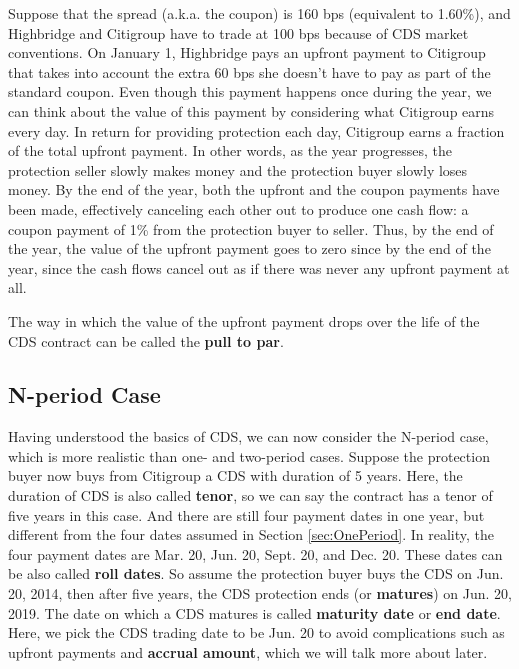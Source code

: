 \documentclass{jss}
\begin{document}
Suppose that the spread (a.k.a. the coupon) is 160 bps (equivalent to 1.60\%), and Highbridge and Citigroup have to trade at 100 bps because of CDS market conventions. On January 1, Highbridge pays an upfront payment to Citigroup that takes into account the extra 60 bps she doesn't have to pay as part of the standard coupon. Even though this payment happens once during the year, we can think about the value of this payment by considering what Citigroup earns every day. In return for providing protection each day, Citigroup earns a fraction of the total upfront payment. In other words, as the year progresses, the protection seller slowly makes money and the protection buyer slowly loses money. By the end of the year, both the upfront and the coupon payments have been made, effectively canceling each other out to produce one cash flow: a coupon payment of 1\% from the protection buyer to seller. Thus, by the end of the year, the value of the upfront payment goes to zero since by the end of the year, since the cash flows cancel out as if there was never any upfront payment at all. 

The way in which the value of the upfront payment drops over the life of the CDS contract can be called the \textbf{pull to par}.

\subsection{N-period Case}
\label{sec:nPeriodCase}

Having understood the basics of CDS, we can now consider the N-period case, which is more realistic than one- and two-period cases. Suppose the protection buyer now buys from Citigroup a CDS with duration of 5 years. Here, the duration of CDS is also called \textbf{tenor}, so we can say the contract has a tenor of five years in this case. And there are still four payment dates in one year, but different from the four dates assumed in Section \ref{sec:OnePeriod}. In reality, the four payment dates are Mar. 20, Jun. 20, Sept. 20, and Dec. 20. These dates can be also called \textbf{roll dates}. So assume the protection buyer buys the CDS on Jun. 20, 2014, then after five years, the CDS protection ends (or \textbf{matures}) on Jun. 20, 2019. The date on which a CDS matures is called \textbf{maturity date} or \textbf{end date}. Here, we pick the CDS trading date to be Jun. 20 to avoid complications such as upfront payments and \textbf{accrual amount}, which we will talk more about later.
\end{document}
